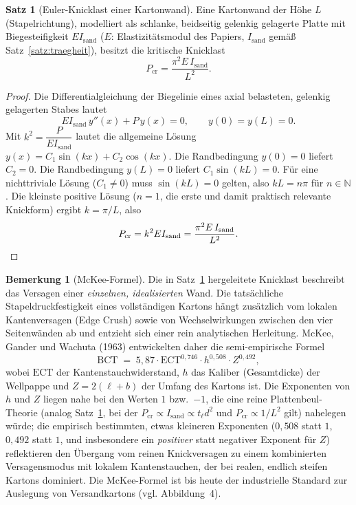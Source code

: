﻿\documentclass[a4paper,12pt]{article}
\theoremstyle{definition}
\newtheorem{satz}{Satz}
\newtheorem{bemerkung}{Bemerkung}
\begin{document}
\begin{satz}[Euler-Knicklast einer Kartonwand]
	\label{satz:euler}
	Eine Kartonwand der Höhe $L$ (Stapelrichtung), modelliert als schlanke,
	beidseitig gelenkig gelagerte Platte mit Biegesteifigkeit $E I_{\mathrm{sand}}$
	($E$: Elastizitätsmodul des Papiers, $I_{\mathrm{sand}}$ gemäß
	Satz~\ref{satz:traegheit}), besitzt die kritische Knicklast
	\[
		P_{\mathrm{cr}} = \frac{\pi^2 E\,I_{\mathrm{sand}}}{L^2}.
	\]
\end{satz}

\begin{proof}
	Die Differentialgleichung der Biegelinie eines axial belasteten,
	gelenkig gelagerten Stabes lautet
	\[
		E I_{\mathrm{sand}}\,y''(x) + P\,y(x) = 0, \qquad y(0) = y(L) = 0.
	\]
	Mit $k^2 = \dfrac{P}{E I_{\mathrm{sand}}}$ lautet die allgemeine Lösung
	$y(x) = C_1 \sin(kx) + C_2\cos(kx)$. Die Randbedingung $y(0)=0$ liefert
	$C_2 = 0$. Die Randbedingung $y(L)=0$ liefert $C_1 \sin(kL) = 0$. Für eine
	nichttriviale Lösung ($C_1 \neq 0$) muss $\sin(kL) = 0$ gelten, also
	$kL = n\pi$ für $n \in \mathbb{N}$. Die kleinste positive Lösung ($n=1$,
	die erste und damit praktisch relevante Knickform) ergibt $k = \pi/L$,
	also
	\[
		P_{\mathrm{cr}} = k^2 E I_{\mathrm{sand}} = \frac{\pi^2 E\,I_{\mathrm{sand}}}{L^2}. \qedhere
	\]
\end{proof}

\begin{bemerkung}[McKee-Formel]
	\label{bem:mckee}
	Die in Satz~\ref{satz:euler} hergeleitete Knicklast beschreibt das
	Versagen einer \emph{einzelnen, idealisierten} Wand. Die tatsächliche
	Stapeldruckfestigkeit eines vollständigen Kartons hängt zusätzlich vom
	lokalen Kantenversagen (Edge Crush) sowie von Wechselwirkungen zwischen
	den vier Seitenwänden ab und entzieht sich einer rein analytischen
	Herleitung. McKee, Gander und Wachuta (1963) entwickelten daher die
	semi-empirische Formel
	\[
		\mathrm{BCT} \;=\; 5{,}87 \cdot \mathrm{ECT}^{0{,}746}
		\cdot h^{0{,}508} \cdot Z^{0{,}492},
	\]
	wobei $\mathrm{ECT}$ der Kantenstauchwiderstand, $h$ das Kaliber
	(Gesamtdicke) der Wellpappe und $Z = 2(\ell+b)$ der Umfang des Kartons ist.
	Die Exponenten von $h$ und $Z$ liegen nahe bei den Werten $1$ bzw.\ $-1$,
	die eine reine Plattenbeul-Theorie (analog Satz~\ref{satz:euler}, bei der
	$P_{\mathrm{cr}} \propto I_{\mathrm{sand}} \propto t_\ell d^2$ und
	$P_{\mathrm{cr}} \propto 1/L^2$ gilt) nahelegen würde; die empirisch
	bestimmten, etwas kleineren Exponenten ($0{,}508$ statt $1$, $0{,}492$
	statt $1$, und insbesondere ein \emph{positiver} statt negativer Exponent
	für $Z$) reflektieren den Übergang vom reinen Knickversagen zu einem
	kombinierten Versagensmodus mit lokalem Kantenstauchen, der bei realen,
	endlich steifen Kartons dominiert. Die McKee-Formel ist bis heute der
	industrielle Standard zur Auslegung von Versandkartons (vgl.
	Abbildung~4).
\end{bemerkung}
\end{document}
